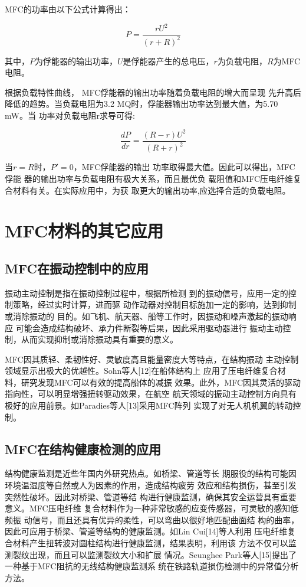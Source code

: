 \documentclass[lang=cn,11pt,a4paper,cite=authoryear]{elegantpaper}
\begin{document}
MFC的功率由以下公式计算得出：

\begin{equation*}
  P = \frac{rU^2}{(r+R)^2}
\end{equation*}

其中，$P$为俘能器的输出功率，$U$是俘能器产生的总电压，$r$为负载电阻，$R$为MFC电阻。

根据负载特性曲线， MFC俘能器的输出功率随着负载电阻的增大而呈现
先升高后降低的趋势。当负载电阻为3.2 MQ时，俘能器输出功率达到最大值，为5.70 mW。当
功率对负载电阻r求导可得:

\begin{equation*}
  \frac{dP}{dr} = \frac{(R-r)U^2}{(R+r)^2}
\end{equation*}

当$r=R$时，$P'=0$，MFC俘能器的输出
功率取得最大值。因此可以得出，MFC俘能
器的输出功率与负载电阻有极大关系，而且最优负
载阻值和MFC压电纤维复合材料有关。在实际应用中，为获
取更大的输出功率,应选择合适的负载电阻。


\section{MFC材料的其它应用}

\subsection{MFC在振动控制中的应用}

振动主动控制是指在振动控制过程中，根据所检测
到的振动信号，应用一定的控制策略，经过实时计算，进而驱
动作动器对控制目标施加一定的影响，达到抑制或消除振动的
目的。如飞机、航天器、船等工作时，因振动和噪声激起的振动响应
可能会造成结构破坏、承力件断裂等后果，因此采用驱动器进行
振动主动控制，从而实现抑制或消除振动具有重要的意义。
  
MFC因其质轻、柔韧性好、灵敏度高且能量密度大等特点，在结构振动
主动控制领域显示出极大的优越性。Sohn等人[12]在船体结构上
应用了压电纤维复合材料，研究发现MFC可以有效的提高船体的减振
效果。此外，MFC因其灵活的驱动指向性，可以明显增强扭转驱动效果，在航空
航天领域的振动主动控制方向具有极好的应用前景。如Paradies等人[13]采用MFC阵列
实现了对无人机机翼的转动控制。

\subsection{MFC在结构健康检测的应用}

结构健康监测是近些年国内外研究热点。如桥梁、管道等长
期服役的结构可能因环境温湿度等自然或人为因素的作用，造成结构疲劳
效应和结构损伤，甚至引发突然性破坏。因此对桥梁、管道等结
构进行健康监测，确保其安全运营具有重要意义。MFC压电纤维
复合材料作为一种非常敏感的应变传感器，可灵敏的感知低频振
动信号，而且还具有优异的柔性，可以弯曲以很好地匹配曲面结
构的曲率，因此可应用于桥梁、管道等结构的健康监测。如Lin Cui[14]等人利用
压电纤维复合材料产生扭转波对圆柱结构进行健康监测，结果表明，利用该
方法不仅可以监测裂纹出现，而且可以监测裂纹大小和扩展
情况。Seunghee Park等人[15]提出了一种基于MFC阻抗的无线结构健康监测系
统在铁路轨道损伤检测中的异常值分析方法。
\end{document}

